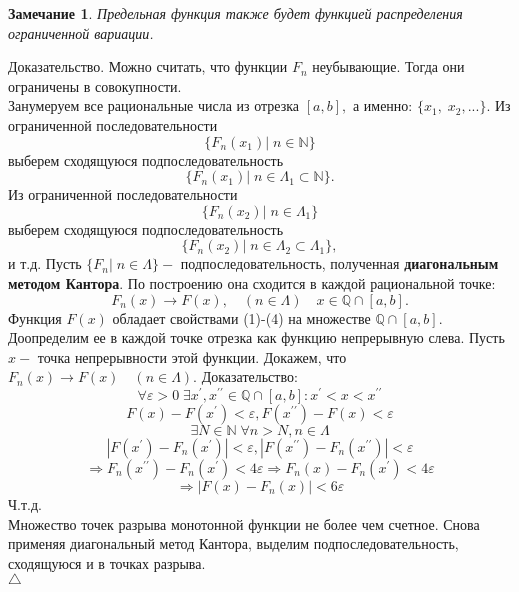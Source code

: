 \documentclass[12pt,a4paper]{article}
\theoremstyle{plain}   \newtheorem{Pro}{Задача}
\newtheorem{Rem}{Замечание}
\begin{document}
\begin{Rem}
Предельная функция также будет функцией распределения
ограниченной вариации.
\end{Rem}
{\Large Доказательство.}
Можно считать, что функции
$ F_n $
неубывающие. Тогда они ограничены в совокупности.\\
Занумеруем все рациональные числа из отрезка
$ [a,b] , $
а именно:
$ \{ x_1 , \; x_2 ,... \} . $
Из ограниченной последовательности
$$
  \{ F_n (x_1 )| \; n \in \mathbb{N} \}
$$
выберем сходящуюся подпоследовательность
$$
  \{ F_n (x_1 )| \; n \in \Lambda _1 \subset \mathbb{N} \} .
$$
Из ограниченной последовательности
$$
  \{ F_n (x_2 )| \; n \in \Lambda _1 \}
$$
выберем сходящуюся подпоследовательность
$$
  \{ F_n (x_2 ) | \; n \in \Lambda _2 \subset \Lambda _1 \} ,
$$
и т.д. Пусть
$ \{ F_n | \; n \in \Lambda \} - $
подпоследовательность, полученная
{\bfseries диагональным методом Кантора}.
По построению она сходится в каждой рациональной точке:
$$
  F_n (x) \rightarrow F(x),
  \quad (n \in \Lambda )
  \quad x \in \mathbb{Q} \cap [a,b] .
$$
Функция
$ F(x) $
обладает свойствами (1)-(4) на множестве
$ \mathbb{Q} \cap [a,b] . $
Доопределим ее в каждой точке отрезка как функцию непрерывную слева.
Пусть
$ x - $
точка непрерывности этой функции. Докажем, что
$ F_n (x) \rightarrow F(x) \quad (n \in \Lambda ). $
Доказательство:
$$
  \forall \varepsilon >0 \; \exists x^{\prime},x^{\prime \prime}
  \in \mathbb{Q} \cap [a,b] :
  x^{\prime}<x<x^{\prime \prime}
$$
$$
  F(x)-F(x^{\prime})<\varepsilon ,
  F(x^{\prime \prime})-F(x)<\varepsilon
$$
$$
  \exists N \in \mathbb{N} \; \forall n>N, n \in \Lambda
$$
$$
  |F(x^{\prime})-F_n (x^{\prime})|<\varepsilon ,
  |F(x^{\prime \prime})-F_n (x^{\prime \prime})|<\varepsilon
$$
$$
  \Rightarrow F_n (x^{\prime \prime})-F_n (x^{\prime})<4 \varepsilon
  \Rightarrow F_n (x)-F_n (x^{\prime})<4 \varepsilon
$$
$$
  \Rightarrow |F(x)-F_n (x)|<6 \varepsilon
$$
Ч.т.д.\\
Множество точек разрыва монотонной функции не более чем счетное.
Снова применяя диагональный метод Кантора, выделим подпоследовательность,
сходящуюся и в точках разрыва.\\
$ \triangle $
\\
\end{document}
